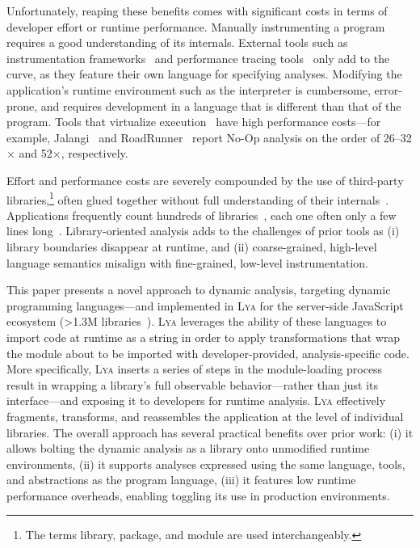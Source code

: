 \documentclass[letterpaper,twocolumn,10pt]{article}
\newcommand{\sys}{{\scshape Lya}\xspace}
\begin{document}
Unfortunately, reaping these benefits comes with significant costs in terms of developer effort or runtime performance.
Manually instrumenting a program requires a good understanding of its internals. 
External tools such as instrumentation frameworks~\cite{pin, valgrind} and performance tracing tools~\cite{perf, dtrace} only add to the curve, as they feature their own language for specifying analyses. 
Modifying the application's runtime environment such as the interpreter is cumbersome, error-prone, and requires development in a language that is different than that of the program.
Tools that virtualize execution~\cite{pin, valgrind, jalangi, roadrunner} have high performance costs---for example, Jalangi~\cite{jalangi} and RoadRunner~\cite{roadrunner} report No-Op analysis on the order of 26--32$\times$ and 52$\times$, respectively.

Effort and performance costs are severely compounded by the use of third-party libraries,\footnote{
  The terms library, package, and module are used interchangeably.
}
often glued together without full understanding of their internals~\cite{libs}.
Applications frequently count hundreds of libraries~\cite{npmstudy:19}, each one often only a few lines long~\cite{leftpad, npmstudy:19}. %
Library-oriented analysis adds to the challenges of prior tools as
  (i) library boundaries disappear at runtime, and
  (ii) coarse-grained, high-level language semantics misalign with fine-grained, low-level instrumentation.

This paper presents a novel approach to dynamic analysis, targeting dynamic programming languages---and implemented in \sys for the server-side JavaScript ecosystem (>1.3M libraries~\cite{modulecounts}). 
\sys leverages the ability of these languages to import code at runtime as a string in order to apply transformations that wrap the module about to be imported with developer-provided, analysis-specific code.
More specifically, \sys inserts a series of steps in the module-loading process result in wrapping a library's full observable behavior---rather than just its interface---and exposing it to developers for runtime analysis.
\sys effectively fragments, transforms, and reassembles the application at the level of individual libraries. 
The overall approach has several practical benefits over prior work:
  (i) it allows bolting the dynamic analysis as a library  onto unmodified runtime environments,
  (ii) it supports analyses expressed using the same language, tools, and abstractions as the program language,
  (iii) it features low runtime performance overheads, enabling toggling its use in production environments.
\end{document}
